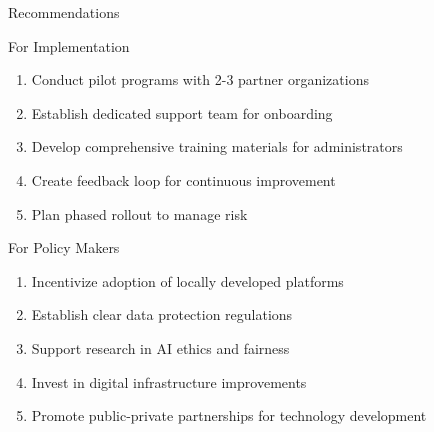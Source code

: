 \begin{frame}{Recommendations}
    \begin{block}{For Implementation}
        \begin{enumerate}
            \item Conduct pilot programs with 2-3 partner organizations
            \item Establish dedicated support team for onboarding
            \item Develop comprehensive training materials for administrators
            \item Create feedback loop for continuous improvement
            \item Plan phased rollout to manage risk
        \end{enumerate}
    \end{block}
    
    \begin{block}{For Policy Makers}
        \begin{enumerate}
            \item Incentivize adoption of locally developed platforms
            \item Establish clear data protection regulations
            \item Support research in AI ethics and fairness
            \item Invest in digital infrastructure improvements
            \item Promote public-private partnerships for technology development
        \end{enumerate}
    \end{block}
\end{frame}

